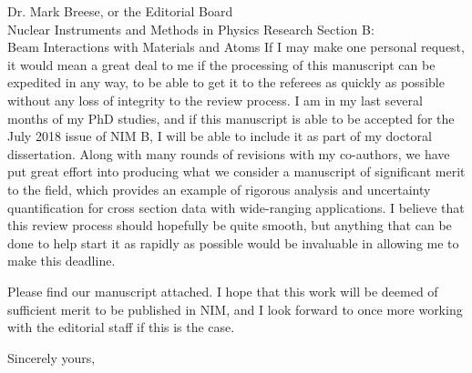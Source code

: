 \documentclass{letter} %
\begin{document}
\begin{letter}{Dr. Mark Breese, or the Editorial Board \\
Nuclear Instruments and Methods in Physics Research Section B: \\
Beam Interactions with Materials and Atoms}
If I may make one personal request, it would mean a great deal to me if the processing of this manuscript can be expedited in any way, to be able to get it to the referees as quickly as possible without any loss of integrity to the review process. 
I am in my last several months of my PhD studies, and if this manuscript is able to be accepted for the July 2018 issue of NIM B, I will be able to include it as part of my doctoral dissertation.
Along with many rounds of revisions with my co-authors, we have put great effort into producing what we consider a manuscript of significant merit to the field, which provides an example of rigorous analysis and uncertainty quantification for cross section data with wide-ranging applications.  
I believe that this review process should hopefully be quite smooth, but anything that can be done to help start it as rapidly as possible would be invaluable in allowing me to make this deadline.


Please find our manuscript attached. I hope that this work will be deemed of sufficient merit to be published in NIM, and I look forward to once more working with the editorial staff if this is the case. 
 
\closing{Sincerely yours,} 
 

 

\end{letter}
 
\end{document}
